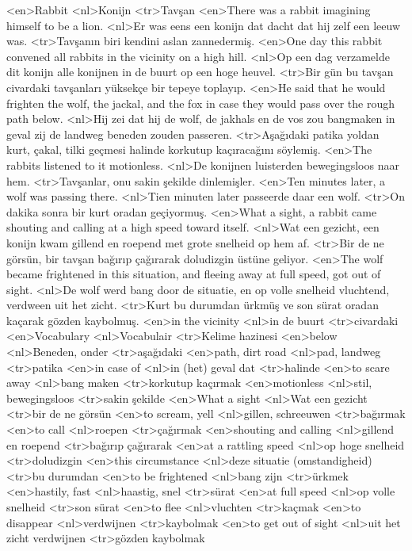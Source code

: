 <en>Rabbit 
<nl>Konijn 
<tr>Tavşan
<en>There was a rabbit imagining himself to be a lion. 
<nl>Er was eens een konijn dat dacht dat hij zelf een leeuw was. 
<tr>Tavşanın biri kendini aslan zannedermiş. 
<en>One day this rabbit convened all rabbits in the vicinity on a high hill.
<nl>Op een dag verzamelde dit konijn alle konijnen in de buurt op een hoge heuvel.
<tr>Bir gün bu tavşan civardaki tavşanları yüksekçe bir tepeye toplayıp.
<en>He said that he would frighten the wolf, the jackal, and the fox in case they would pass over the rough path below.
<nl>Hij zei dat hij de wolf, de jakhals en de vos zou bangmaken in geval zij  de landweg beneden zouden passeren. 
<tr>Aşağıdaki patika yoldan kurt, çakal, tilki geçmesi halinde korkutup kaçıracağını söylemiş. 
<en>The rabbits listened to it motionless.
<nl>De konijnen luisterden  bewegingsloos naar hem.
<tr>Tavşanlar, onu sakin şekilde dinlemişler.
<en>Ten minutes later, a wolf was passing there.
<nl>Tien minuten later passeerde daar een wolf.
<tr>On dakika sonra bir kurt oradan geçiyormuş.
<en>What a sight,  a rabbit came shouting and calling at a high speed toward itself. 
<nl>Wat een gezicht, een konijn kwam gillend en roepend met grote snelheid op hem af.
<tr>Bir de ne görsün, bir tavşan bağırıp çağırarak doludizgin üstüne geliyor.
<en>The wolf became  frightened in this situation, and fleeing away at full speed, got out of sight.
<nl>De wolf werd bang door de situatie, en  op volle snelheid vluchtend,  verdween uit het zicht.
<tr>Kurt bu durumdan ürkmüş ve son sürat oradan kaçarak gözden kaybolmuş.
<en>in the vicinity
<nl>in de buurt
<tr>civardaki
<en>Vocabulary
<nl>Vocabulair
<tr>Kelime hazinesi
<en>below
<nl>Beneden, onder 
<tr>aşağıdaki
<en>path, dirt road
<nl>pad, landweg
<tr>patika
<en>in case of
<nl>in (het) geval dat
<tr>halinde
<en>to scare away
<nl>bang maken
<tr>korkutup kaçırmak
<en>motionless
<nl>stil, bewegingsloos
<tr>sakin şekilde
<en>What a sight
<nl>Wat een gezicht
<tr>bir de ne görsün
<en>to scream, yell
<nl>gillen, schreeuwen
<tr>bağırmak
<en>to call
<nl>roepen
<tr>çağırmak
<en>shouting and calling
<nl>gillend en roepend 
<tr>bağırıp çağırarak
<en>at a rattling speed
<nl>op hoge snelheid
<tr>doludizgin
<en>this circumstance
<nl>deze situatie (omstandigheid)
<tr>bu durumdan
<en>to be frightened
<nl>bang zijn
<tr>ürkmek
<en>hastily, fast
<nl>haastig, snel
<tr>sürat
<en>at full speed
<nl>op volle snelheid
<tr>son sürat
<en>to flee 
<nl>vluchten
<tr>kaçmak
<en>to disappear 
<nl>verdwijnen
<tr>kaybolmak
<en>to get out of sight
<nl>uit het zicht verdwijnen
<tr>gözden kaybolmak
